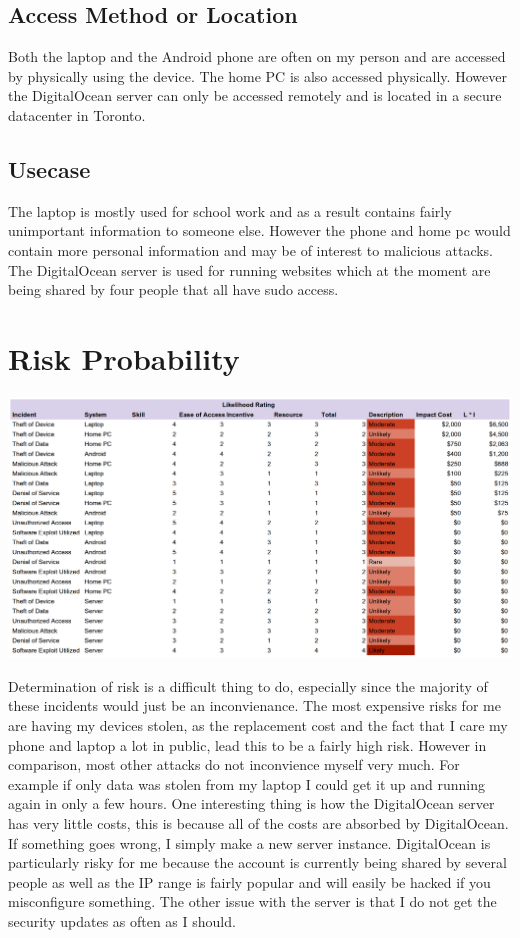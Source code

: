 \documentclass[a4paper, 11pt]{article}
\begin{document}
\subsection*{Access Method or Location}
Both the laptop and the Android phone are often on my person and are accessed by physically using the device.  The home PC is also accessed physically.  However the DigitalOcean server can only be accessed remotely and is located in a secure datacenter in Toronto.

\subsection*{Usecase}
The laptop is mostly used for school work and as a result contains fairly unimportant information to someone else.  However the phone and home pc would contain more personal information and may be of interest to malicious attacks.  The DigitalOcean server is used for running websites which at the moment are being shared by four people that all have sudo access.

\section*{Risk Probability}
\includegraphics[scale=0.21]{risk.png}

Determination of risk is a difficult thing to do, especially since the majority of these incidents would just be an inconvienance.  The most expensive risks for me are having my devices stolen, as the replacement cost and the fact that I care my phone and laptop a lot in public, lead this to be a fairly high risk.  However in comparison, most other attacks do not inconvience myself very much.  For example if only data was stolen from my laptop I could get it up and running again in only a few hours.  One interesting thing is how the DigitalOcean server has very little costs, this is because all of the costs are absorbed by DigitalOcean.  If something goes wrong, I simply make a new server instance.  DigitalOcean is particularly risky for me because the account is currently being shared by several people as well as the IP range is fairly popular and will easily be hacked if you misconfigure something.  The other issue with the server is that I do not get the security updates as often as I should.\\
\end{document}
